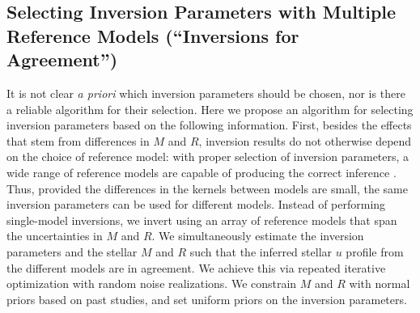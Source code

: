 \subsection{Selecting Inversion Parameters with Multiple Reference Models (``Inversions for Agreement'')} 
\label{sec:inversion-for-agreement}
It is not clear \emph{a priori} which inversion parameters should be chosen, nor is there a reliable algorithm for their selection. 
Here we propose an algorithm for selecting inversion parameters based on the following information. 
First, besides the effects that stem from differences in $M$ and $R$, inversion results do not otherwise depend on the choice of reference model: with proper selection of inversion parameters, a wide range of reference models are capable of producing the correct inference \citep{2000ApJ...529.1084B}. 
Thus, provided the differences in the kernels between models are small, the same inversion parameters can be used for different models. 
Instead of performing single-model inversions, we invert using an array of reference models that span the uncertainties in $M$ and $R$. 
We simultaneously estimate the inversion parameters and the stellar $M$ and $R$ such that the inferred stellar $u$ profile from the different models are in agreement. 
We achieve this via repeated iterative optimization with random noise realizations. 
We constrain $M$ and $R$ with normal priors based on past studies, and set uniform priors on the inversion parameters. 


